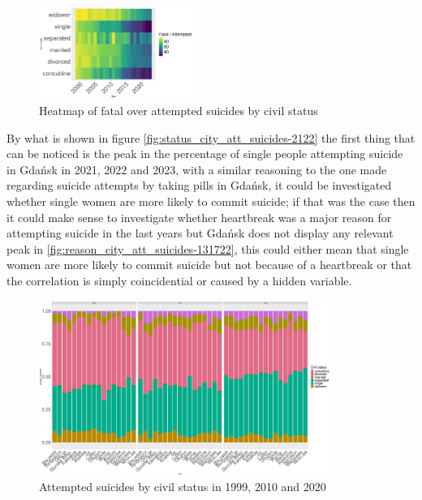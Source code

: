 \documentclass{article}
\begin{document}
\begin{figure}[H]
    \centering
    \includegraphics[width=0.45\textwidth]{imgs/status_foa_heat.pdf}
    \caption{Heatmap of fatal over attempted suicides by civil status }
    \label{fig:status_foa_heat}
\end{figure}
By what is shown in figure \ref{fig:status_city_att_suicides-2122}
the first thing that can be noticed is the peak in the percentage of
single people attempting suicide in Gdańsk in 2021, 2022 and 2023,
with a similar reasoning to the one made regarding suicide attempts
by taking pills in Gdańsk, it could be investigated whether single
women are more likely to commit suicide; if that was the case then 
it could make sense to investigate whether heartbreak was a major reason
for attempting suicide in the last years but Gdańsk does not display any relevant
peak in \ref{fig:reason_city_att_suicides-131722}, this could either mean that 
single women are more likely to commit suicide but not because of 
a heartbreak or that the correlation is simply coincidential or caused
by a hidden variable.
\begin{figure}[H]
    \centering
    \includegraphics[width=0.85\textwidth]{imgs/status_city_att_suicides-991020.pdf}
    \caption{Attempted suicides by civil status  in 1999, 2010 and 2020}
    \label{fig:status_city_att_suicides-991020}
\end{figure}
\end{document}
